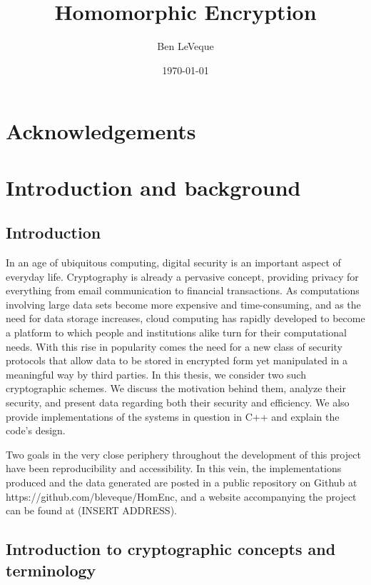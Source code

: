 \documentclass[11pt]{report}
\title{Homomorphic Encryption}
\author{Ben LeVeque}
\date{\today}
\begin{document}
\maketitle


\tableofcontents

\newpage

\chapter{Acknowledgements}


\chapter{Introduction and background}

\section{Introduction}

In an age of ubiquitous computing, digital security is an important aspect of everyday life. Cryptography is already a pervasive concept, providing privacy for everything from email communication to financial transactions. As computations involving large data sets become more expensive and time-consuming, and as the need for data storage increases, cloud computing has rapidly developed to become a platform to which people and institutions alike turn for their computational needs. With this rise in popularity comes the need for a new class of security protocols that allow data to be stored in encrypted form yet manipulated in a meaningful way by third parties. In this thesis, we consider two such cryptographic schemes. We discuss the motivation behind them, analyze their security, and present data regarding both their security and efficiency. We also provide implementations of the systems in question in C++ and explain the code's design.

Two goals in the very close periphery throughout the development of this project have been reproducibility and accessibility. In this vein, the implementations produced and the data generated are posted in a public repository on Github at https://github.com/bleveque/HomEnc, and a website accompanying the project can be found at (INSERT ADDRESS).

\section{Introduction to cryptographic concepts and terminology} 
\end{document}
